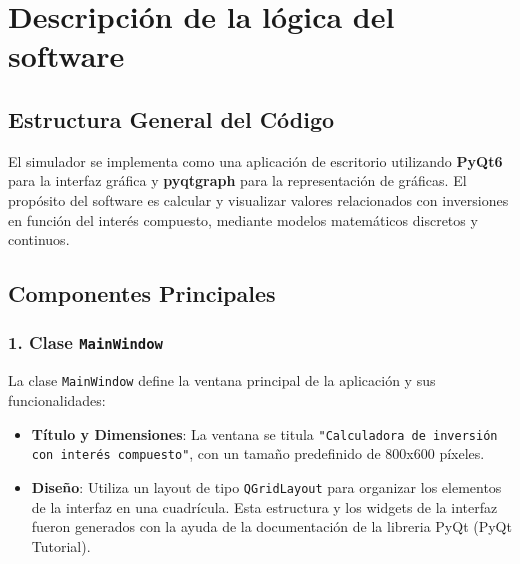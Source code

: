 \documentclass{article}
\begin{document}
\section{Descripción de la lógica del software}

\subsection{Estructura General del Código}
El simulador se implementa como una aplicación de escritorio utilizando \textbf{PyQt6} para la interfaz gráfica y \textbf{pyqtgraph} para la representación de gráficas. El propósito del software es calcular y visualizar valores relacionados con inversiones en función del interés compuesto, mediante modelos matemáticos discretos y continuos.

\subsection{Componentes Principales}

\subsubsection{1. Clase \texttt{MainWindow}}
La clase \texttt{MainWindow} define la ventana principal de la aplicación y sus funcionalidades:

\begin{itemize}
    \item \textbf{Título y Dimensiones}: La ventana se titula \texttt{"Calculadora de inversión con interés compuesto"}, con un tamaño predefinido de 800x600 píxeles.
    \item \textbf{Diseño}: Utiliza un layout de tipo \texttt{QGridLayout} para organizar los elementos de la interfaz en una cuadrícula. Esta estructura y los widgets de la interfaz fueron generados con la ayuda de la documentación de la libreria PyQt (PyQt Tutorial).
\end{itemize}
\end{document}
